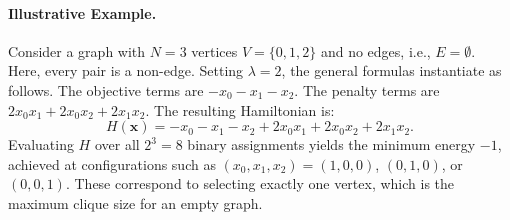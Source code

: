 \documentclass[12pt]{article}
\begin{document}
\paragraph{Illustrative Example.}
Consider a graph with $N=3$ vertices $V=\{0,1,2\}$ and no edges, i.e., $E=\emptyset$. Here, every pair is a non-edge. Setting $\lambda=2$, the general formulas instantiate as follows. The objective terms are $-x_0 - x_1 - x_2$. The penalty terms are $2x_0x_1 + 2x_0x_2 + 2x_1x_2$. The resulting Hamiltonian is:
\begin{equation}
    H(\mathbf{x}) = -x_0 - x_1 - x_2 + 2x_0x_1 + 2x_0x_2 + 2x_1x_2.
\end{equation}
Evaluating $H$ over all $2^3=8$ binary assignments yields the minimum energy $-1$, achieved at configurations such as $(x_0,x_1,x_2) = (1,0,0)$, $(0,1,0)$, or $(0,0,1)$. These correspond to selecting exactly one vertex, which is the maximum clique size for an empty graph.
\end{document}
